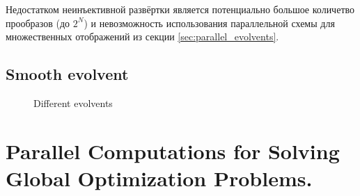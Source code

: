 \documentclass[runningheads]{llncs}
\begin{document}
Недостатком неинъективной развёртки является потенциально большое количетво прообразов (до $2^N$) и невозможность использования параллельной схемы для множественных отображений из секции \ref{sec:parallel_evolvents}.

\subsection{Smooth evolvent}


\begin{figure}[ht]
    \centering
    \caption{Different evolvents}
\end{figure}

\section{Parallel Computations for Solving Global Optimization Problems.}
\end{document}
